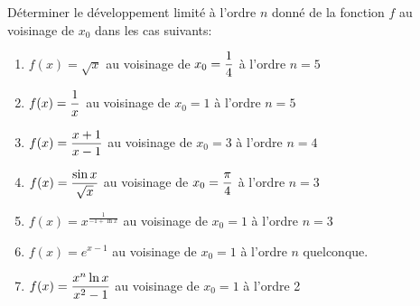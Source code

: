 \documentclass[a4paper, 11pt,reqno]{article}
\begin{document}

\begin{exercice}  \;
	D\'eterminer le d\'eveloppement limit\'e \`a l'ordre $n$ donn\'e de la fonction $f$ au voisinage de $x_0$ dans les cas suivants:
	\begin{enumerate}
		\item $f(x)=\sqrt{x}$ au voisinage de $x_0=\displaystyle\frac{1}{4}$ \`a l'ordre $n=5$\vsec
		\item $f(x)=\displaystyle\frac{1}{x}$ au voisinage de $x_0=1$ \`a l'ordre $n=5$\vsec
		\item $f(x)=\displaystyle\frac{x+1}{x-1}$ au voisinage de $x_0=3$ \`a l'ordre $n=4$\vsec
		\item $f(x)=\displaystyle\frac{\sin{x}}{\sqrt{x}}$ au voisinage de $x_0=\displaystyle\frac{\pi}{4}$ \`a l'ordre $n=3$\vsec
		\item $f(x)=x^{\frac{1}{-1+\ln{x}}}$ au voisinage de $x_0=1$ \`a l'ordre $n=3$\vsec
		\item $f(x)=e^{x-1}$ au voisinage de $x_0=1$ \`a l'ordre $n$ quelconque.\vsec
		\item $f(x)=\displaystyle\frac{x^n\ln{x}}{x^2-1}$ au voisinage de $x_0=1$ \`a l'ordre 2
	\end{enumerate}
\end{exercice}
\end{document}
